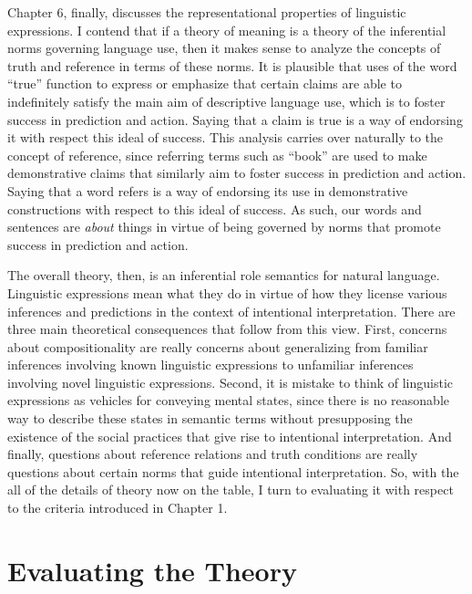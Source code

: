 Chapter 6, finally, discusses the representational properties of linguistic expressions. I contend that if a theory of meaning is a theory of the inferential norms governing language use, then it makes sense to analyze the concepts of truth and reference in terms of these norms. It is plausible that uses of the word ``true'' function to express or emphasize that certain claims are able to indefinitely satisfy the main aim of descriptive language use, which is to foster success in prediction and action. Saying that a claim is true is a way of endorsing it with respect this ideal of success. This analysis carries over naturally to the concept of reference, since referring terms such as ``book'' are used to make demonstrative claims that similarly aim to foster success in prediction and action. Saying that a word refers is a way of endorsing its use in demonstrative constructions with respect to this ideal of success. As such, our words and sentences are \textit{about} things in virtue of being governed by norms that promote success in prediction and action.

The overall theory, then, is an inferential role semantics for natural language. Linguistic expressions mean what they do in virtue of how they license various inferences and predictions in the context of intentional interpretation. There are three main theoretical consequences that follow from this view. First, concerns about compositionality are really concerns about generalizing from familiar inferences involving known linguistic expressions to unfamiliar inferences involving novel linguistic expressions. Second, it is mistake to think of linguistic expressions as vehicles for conveying mental states, since there is no reasonable way to describe these states in semantic terms without presupposing the existence of the social practices that give rise to intentional interpretation. And finally, questions about reference relations and truth conditions are really questions about certain norms that guide intentional interpretation. So, with the all of the details of theory now on the table, I turn to evaluating it with respect to the criteria introduced in Chapter 1. 

\section{Evaluating the Theory}

